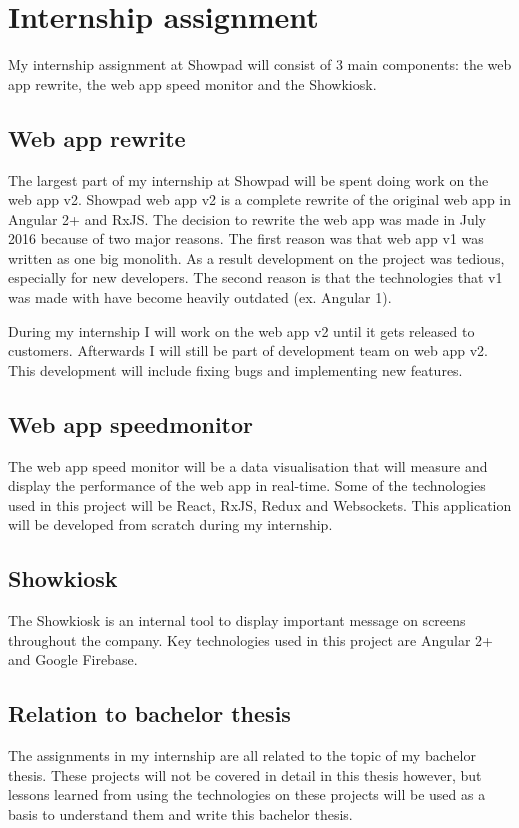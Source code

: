 \chapter{Internship assignment} %
\label{sec:opdracht}

My internship assignment at Showpad will consist of 3 main components: the web app rewrite, the web app speed monitor and the Showkiosk.

\section{Web app rewrite}

The largest part of my internship at Showpad will be spent doing work on the web app v2. Showpad web app v2 is a complete rewrite of the original web app in Angular 2+ and RxJS. The decision to rewrite the web app was made in July 2016 because of two major reasons. The first reason was that web app v1 was written as one big monolith. As a result development on the project was tedious, especially for new developers. The second reason is that the technologies that v1 was made with have become heavily outdated (ex. Angular 1).

During my internship I will work on the web app v2 until it gets released to customers. Afterwards I will still be part of development team on web app v2. This development will include fixing bugs and implementing new features.

\section{Web app speedmonitor}

The web app speed monitor will be a data visualisation that will measure and display the performance of the web app in real-time. Some of the technologies used in this project will be React, RxJS, Redux and Websockets. This application will be developed from scratch during my internship.

\section{Showkiosk}

The Showkiosk is an internal tool to display important message on screens throughout the company. Key technologies used in this project are Angular 2+ and Google Firebase.

\section{Relation to bachelor thesis}

The assignments in my internship are all related to the topic of my bachelor thesis. These projects will not be covered in detail in this thesis however, but lessons learned from using the technologies on these projects will be used as a basis to understand them and write this bachelor thesis.